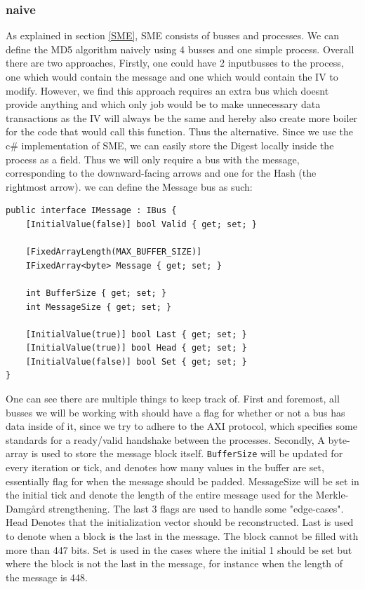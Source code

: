 \documentclass[a4paper]{article}
\begin{document}
\subsubsection{naive}
\label{sec:orge315e50}
As explained in section \ref{SME}, SME consists of busses and processes. We can define the MD5 algorithm naively using 4 busses and one simple process. Overall there are two approaches,
Firstly, one could have 2 inputbusses to the process, one which would contain the message and one which would contain the IV to modify. However, we find this approach requires an extra bus which doesnt provide anything and which only job would be to make unnecessary data transactions as the IV will always be the same and hereby also create more boiler for the code that would call this function. Thus the alternative. Since we use the c\# implementation of SME, we can easily store the Digest locally inside the process as a field. Thus we will only require a bus with the message, corresponding to the downward-facing arrows and one for the Hash (the rightmost arrow).
we can define the Message bus as such:
\begin{verbatim}
public interface IMessage : IBus {
    [InitialValue(false)] bool Valid { get; set; }

    [FixedArrayLength(MAX_BUFFER_SIZE)]
    IFixedArray<byte> Message { get; set; }

    int BufferSize { get; set; }
    int MessageSize { get; set; }

    [InitialValue(true)] bool Last { get; set; }
    [InitialValue(true)] bool Head { get; set; }
    [InitialValue(false)] bool Set { get; set; }
}
\end{verbatim}
One can see there are multiple things to keep track of. First and foremost, all busses we will be working with should have a flag for whether or not a bus has data inside of it, since we try to adhere to the AXI protocol, which specifies some standards for a ready/valid handshake between the processes. Secondly, A byte-array is used to store the message block itself. \texttt{BufferSize} will be updated for every iteration or tick, and denotes how many values in the buffer are set, essentially flag for when the message should be padded. MessageSize will be set in the initial tick and denote the length of the entire message used for the Merkle-Damgård strengthening.
The last 3 flags are used to handle some "edge-cases".
Head Denotes that the initialization vector should be reconstructed.
Last is used to denote when a block is the last in the message. The block cannot be filled with more than 447 bits.
Set is used in the cases where the initial 1 should be set but where the block is not the last in the message, for instance when the length of the message is 448.
\end{document}
